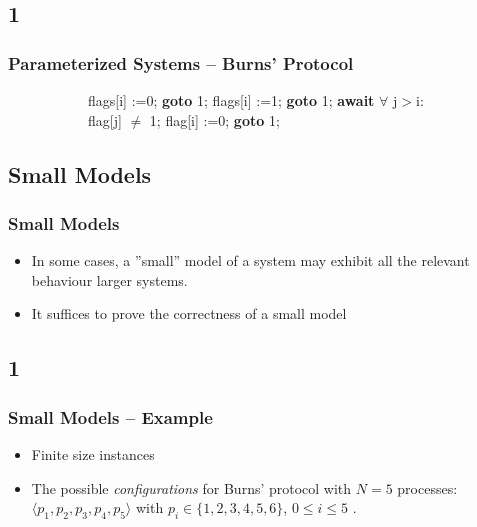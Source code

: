 \documentclass[handout]{beamer}
\begin{document}
\subsection*{1}
\begin{frame}
  \frametitle{Parameterized Systems -- Burns' Protocol}
  \begin{figure}
    \begin{example}
      \begin{subfigure}[b]{0.49\textwidth}
        \begin{algorithmic}
          \footnotesize
          \State flags[i] :=0;
           \State \textbf{goto} 1;
          \EndIf
          \State flags[i] :=1;
           \State \textbf{goto} 1;
          \EndIf
          \State \textbf{await} $\forall$ j$>$i: flag[j] $\neq$ 1;
          \State flag[i] :=0; \textbf{goto} 1;
        \end{algorithmic}
      \end{subfigure}
      \begin{subfigure}[b]{0.49\textwidth}
        \burns
      \end{subfigure}
    \end{example}
  \end{figure}
\end{frame}


\subsection{Small Models}
\begin{frame}
  \frametitle{Small Models}
  \begin{itemize}
  \item
    In some cases, a ''small'' model of a system may exhibit all the relevant behaviour larger systems. %
  \item
    It suffices to prove the correctness of a small model
  \end{itemize}
\end{frame}

\subsection*{1}
\begin{frame}
  \frametitle{Small Models -- Example}
  \begin{itemize}
  \item Finite size instances
  \item The possible \emph{configurations} for Burns' protocol with $N=5$ processes: $\langle p_1, p_2, p_3, p_4, p_5 \rangle$ with $p_i \in \{1,2,3,4,5,6\}$, $0 \leq i \leq 5$ .
  \end{itemize}
\end{frame}
\end{document}
